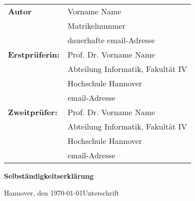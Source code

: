  \newpage \thispagestyle{empty}
 \begin{tabular}{ll}
{\bfseries\sffamily Autor} &  Vorname Name \\ 
            & Matrikelnummer \\
            & dauerhafte email-Adresse \\[5ex]
{\bfseries\sffamily Erstprüferin:} & Prof. Dr. Vorname Name \\
          & Abteilung Informatik, Fakultät IV \\
         & Hochschule Hannover \\
        & email-Adresse \\[5ex]
{\bfseries\sffamily Zweitprüfer:} &Prof. Dr. Vorname Name \\
          & Abteilung Informatik, Fakultät IV \\
         & Hochschule Hannover \\
        & email-Adresse
\end{tabular}

\vfill

\begin{center} \sffamily\bfseries Selbständigkeitserklärung \end{center}


\vspace*{7ex}

Hannover, den \today \hfill Unterschrift
